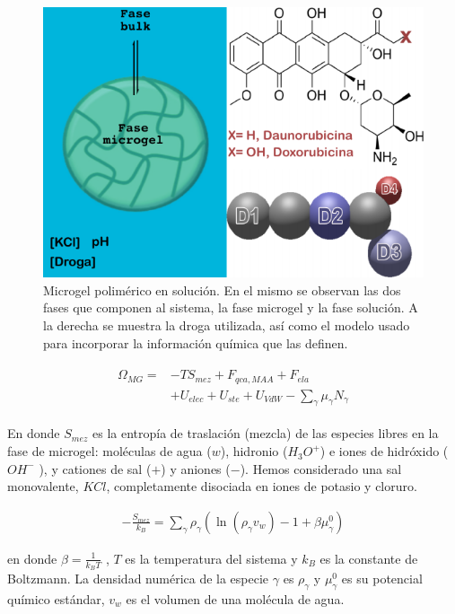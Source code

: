 \begin{figure}[!ht]
	\centering
	\includegraphics[width=0.65\linewidth]{Figures/graph-gel/gel_model.pdf}
	\caption{Microgel polim\'erico en soluci\'on. En el mismo se observan las dos fases que componen al sistema, la fase microgel y la fase soluci\'on. A la derecha se muestra la droga utilizada, as\'i como el modelo usado para incorporar la informaci\'on qu\'imica que las definen.}
	\label{fig:gel:model_gel}
\end{figure}




%
\begin{align}
    \begin{aligned}
       \Omega_{MG}=& -TS_{mez} + F_{qca,MAA} +  F_{ela}\\
       & + U_{elec}+  U_{ste} + U_{VdW} -{\sum_{\gamma}
        {\mu_\gamma N_\gamma}}
    \end{aligned}
    \label{eq:gel:free-energy-implicit}
\end{align}
%

\noindent En donde $S_{mez}$ es la entrop\'ia de traslaci\'on (mezcla) de las especies libres en la fase de microgel: mol\'eculas de agua ($w$), hidronio ($H_3O^+$) e iones de hidr\'oxido ($OH^-$ ), y cationes de sal ($+$) y aniones ($-$).
Hemos considerado una sal monovalente, $KCl$,  completamente disociada en iones de potasio y cloruro.

\begin{align}
-\frac{S_{mez}}{k_B}	= \sum_{\gamma} \rho_\gamma\left(\ln\left(\rho_\gamma v_w\right) -1 + \beta\mu^0_\gamma\right) 
\end{align}

\noindent en donde  $\beta=\frac{1}{k_BT}$ , $T$ es la temperatura del sistema  y  $k_B$ es la constante de Boltzmann.
La densidad num\'erica de la especie $\gamma$ es $\rho_\gamma$ y $\mu^0_\gamma$ es su potencial qu\'imico est\'andar,  $v_w$ es el volumen de una mol\'ecula de agua.

